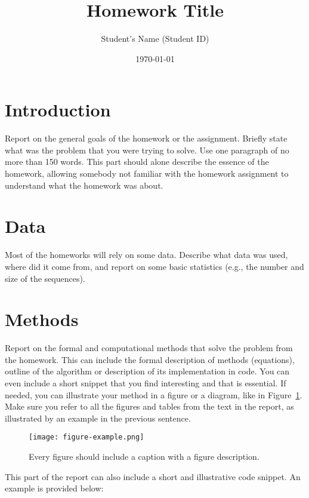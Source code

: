 \documentclass[a4paper,11pt]{article}
\title{Homework Title}
\author{Student's Name (Student ID)}
\date{\today}
\begin{document}
\maketitle

\section{Introduction}

Report on the general goals of the homework or the assignment. Briefly state what was the problem that you were trying to solve. Use one paragraph of no more than 150 words. This part should alone describe the essence of the homework, allowing somebody not familiar with the homework assignment to understand what the homework was about.

\section{Data}

Most of the homeworks will rely on some data. Describe what data was used, where did it come from, and report on some basic statistics (e.g., the number and size of the sequences).

\section{Methods}

Report on the formal and computational methods that solve the problem from the homework. This can include the formal description of methods (equations),  outline of the algorithm or description of its  implementation in code. You can even include a short snippet that you find interesting and that is essential. If needed, you can illustrate your method in a figure or a diagram, like in Figure~\ref{fig-example}. Make sure you refer to all the figures and tables from the text in the report, as illustrated by an example in the previous sentence.

\begin{figure}[htbp]
\begin{center}
\texttt{[image: figure-example.png]}
\caption{Every figure should include a caption with a figure description.}
\label{fig-example}
\end{center}
\end{figure}

This part of the report can also include a short and illustrative code snippet. An example is provided below:
\end{document}
